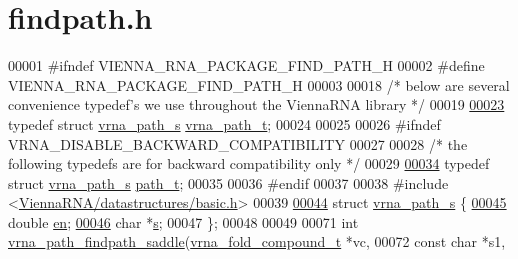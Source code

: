 \hypertarget{findpath_8h_source}{}\section{findpath.\+h}
\label{findpath_8h_source}

\begin{DoxyCode}
00001 \textcolor{preprocessor}{#ifndef VIENNA\_RNA\_PACKAGE\_FIND\_PATH\_H}
00002 \textcolor{preprocessor}{#define VIENNA\_RNA\_PACKAGE\_FIND\_PATH\_H}
00003 
00018 \textcolor{comment}{/* below are several convenience typedef's we use throughout the ViennaRNA library */}
00019 
\hyperlink{group__direct__paths_ga818d4f3d1cf8723d6905990b08d909fe}{00023} \textcolor{keyword}{typedef} \textcolor{keyword}{struct }\hyperlink{group__direct__paths_structvrna__path__s}{vrna\_path\_s} \hyperlink{group__direct__paths_structvrna__path__s}{vrna\_path\_t};
00024 
00025 
00026 \textcolor{preprocessor}{#ifndef VRNA\_DISABLE\_BACKWARD\_COMPATIBILITY}
00027 
00028 \textcolor{comment}{/* the following typedefs are for backward compatibility only */}
00029 
\hyperlink{group__direct__paths_gab6b8737d5377e70a7815d04aae7fd884}{00034} \textcolor{keyword}{typedef} \textcolor{keyword}{struct }\hyperlink{group__direct__paths_structvrna__path__s}{vrna\_path\_s} \hyperlink{group__direct__paths_structvrna__path__s}{path\_t};
00035 
00036 \textcolor{preprocessor}{#endif}
00037 
00038 \textcolor{preprocessor}{#include <\hyperlink{datastructures_2basic_8h}{ViennaRNA/datastructures/basic.h}>}
00039 
\hyperlink{group__direct__paths}{00044} \textcolor{keyword}{struct }\hyperlink{group__direct__paths_structvrna__path__s}{vrna\_path\_s} \{
\hyperlink{group__direct__paths_ac25160bf31d28097358278f367e41227}{00045}   \textcolor{keywordtype}{double}  \hyperlink{group__direct__paths_ac25160bf31d28097358278f367e41227}{en}; 
\hyperlink{group__direct__paths_a141b70a59cb81d10bc65bbb7a0f6db77}{00046}   \textcolor{keywordtype}{char}    *\hyperlink{group__direct__paths_a141b70a59cb81d10bc65bbb7a0f6db77}{s}; 
00047 \};
00048 
00049 
00071 \textcolor{keywordtype}{int} \hyperlink{group__direct__paths_gad611574a76593e26021f177e7854b6b4}{vrna\_path\_findpath\_saddle}(\hyperlink{group__fold__compound_structvrna__fc__s}{vrna\_fold\_compound\_t}  *vc,
00072                               \textcolor{keyword}{const} \textcolor{keywordtype}{char}            *s1,

\end{DoxyCode}
